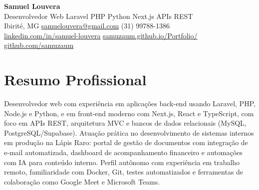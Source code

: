 \documentclass[11pt,a4paper]{article}
\begin{document}
{\LARGE\bfseries\color{accent} Samuel Louvera}\\[3pt]
{\large Desenvolvedor Web \textbar{} Laravel \textbullet{} PHP \textbullet{} Python \textbullet{} Next.js \textbullet{} APIs REST}\\[5pt]
Ibirité, MG \quad\textbullet\quad
\href{mailto:samuelouvera@gmail.com}{samuelouvera@gmail.com} \quad\textbullet\quad
(31) 99788-1386\\
\href{https://linkedin.com/in/samuel-louvera}{linkedin.com/in/samuel-louvera} \quad\textbullet\quad
\href{https://samuzaum.github.io/Portfolio/}{samuzaum.github.io/Portfolio/} \quad\textbullet\quad
\href{https://github.com/samuzaum}{github.com/samuzaum}

\section{Resumo Profissional}
Desenvolvedor web com experiência em aplicações back-end usando Laravel, PHP, Node.js e Python, e em
front-end moderno com Next.js, React e TypeScript, com foco em APIs REST, arquitetura MVC e bancos de
dados relacionais (MySQL, PostgreSQL/Supabase). Atuação prática no desenvolvimento de sistemas internos
em produção na Lápis Raro: portal de gestão de documentos com integração de e-mail automatizada,
dashboard de acompanhamento financeiro e automações com IA para conteúdo interno. Perfil autônomo com
experiência em trabalho remoto, familiaridade com Docker, Git, testes automatizados e ferramentas de
colaboração como Google Meet e Microsoft Teams.

\end{document}
